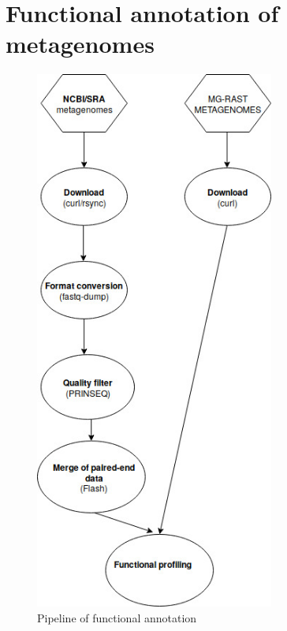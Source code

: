 \documentclass[12pt, a4paper]{report}
\begin{document}
\chapter{Functional annotation of metagenomes}
\begin{figure}
  \centering 
  \includegraphics[width=0.7\textwidth]{figures/pipeline_functional.jpg}
  \caption{Pipeline of functional annotation}
  \end{figure}
\end{document}
